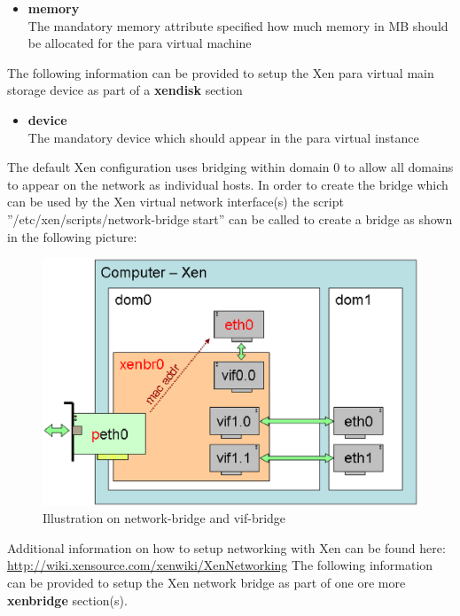 \begin{itemize}
	\begin{itemize}
	\item \textbf{memory}\\
      The mandatory memory attribute specified how much memory in MB
      should be allocated for the para virtual machine    
	\end{itemize}

	The following information can be provided to setup the Xen para virtual
	main storage device as part of a \textbf{xendisk} section

	\begin{itemize}
	\item \textbf{device}\\
      The mandatory device which should appear in the para virtual
      instance
	\end{itemize}

	The default Xen configuration uses bridging within domain 0 to allow all
	domains to appear on the network as individual hosts. In order to create
	the bridge which can be used by the Xen virtual network interface(s) the
	script ''/etc/xen/scripts/network-bridge start'' can be called to create
	a bridge as shown in the following picture:

	\begin{figure}[h]
	\centering
	\includegraphics[scale=0.5]{pictures/xenbridge.eps}
	\caption{Illustration on network-bridge and vif-bridge}
	\label{fig:architecture}
	\end{figure}

	Additional information on how to setup networking with Xen can be
	found here: \url{http://wiki.xensource.com/xenwiki/XenNetworking}
	The following information can be provided to setup the Xen network
	bridge as part of one ore more \textbf{xenbridge} section(s).


\end{itemize}
